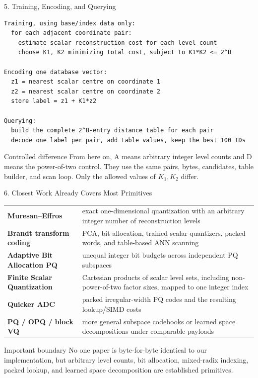 \documentclass[aspectratio=169]{beamer}
\begin{document}
\begin{frame}[fragile]{5. Training, Encoding, and Querying}
\footnotesize
\begin{verbatim}
Training, using base/index data only:
  for each adjacent coordinate pair:
    estimate scalar reconstruction cost for each level count
    choose K1, K2 minimizing total cost, subject to K1*K2 <= 2^B

Encoding one database vector:
  z1 = nearest scalar centre on coordinate 1
  z2 = nearest scalar centre on coordinate 2
  store label = z1 + K1*z2

Querying:
  build the complete 2^B-entry distance table for each pair
  decode one label per pair, add table values, keep the best 100 IDs
\end{verbatim}
\begin{alertblock}{Controlled difference}
From here on, A means arbitrary integer level counts and D means the
power-of-two control. They use the same pairs, bytes, candidates, table builder,
and scan loop. Only the allowed values of \(K_1,K_2\) differ.
\end{alertblock}
\end{frame}

\begin{frame}{6. Closest Work Already Covers Most Primitives}
\footnotesize
\begin{tabularx}{\textwidth}{>{\bfseries}p{} X}
Muresan--Effros & exact one-dimensional quantization with an arbitrary
integer number of reconstruction levels\\
Brandt transform coding & PCA, bit allocation, trained scalar quantizers,
packed words, and table-based ANN scanning\\
Adaptive Bit Allocation PQ & unequal integer bit budgets across independent
PQ subspaces\\
Finite Scalar Quantization & Cartesian products of scalar level sets,
including non-power-of-two factor sizes, mapped to one integer index\\
Quicker ADC & packed irregular-width PQ codes and the resulting lookup/SIMD
costs\\
PQ / OPQ / block VQ & more general subspace codebooks or learned space
decompositions under comparable payloads\\
\end{tabularx}
\begin{alertblock}{Important boundary}
No one paper is byte-for-byte identical to our implementation, but arbitrary
level counts, bit allocation, mixed-radix indexing, packed lookup, and learned
space decomposition are established primitives.
\end{alertblock}
\end{frame}
\end{document}
